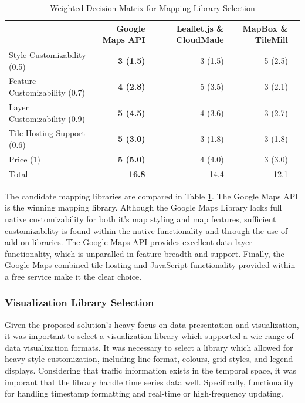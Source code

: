 \documentclass{report}
\begin{document}
\begin{table}
\centering
    \begin{tabular}{l |r r r l}
    ~                             & \textbf{Google Maps API} & Leaflet.js \& CloudMade & MapBox \& TileMill \\ \hline
    Style Customizability  (0.5)  & \textbf{3 (1.5)}         & 3 (1.5)                 & 5 (2.5)            \\
    Feature Customizability (0.7) & \textbf{4 (2.8)}         & 5 (3.5)                 & 3 (2.1)            \\
    Layer Customizability (0.9)   & \textbf{5 (4.5)}         & 4 (3.6)                 & 3 (2.7)            \\
    Tile Hosting Support (0.6)    & \textbf{5 (3.0)}           & 3 (1.8)                 & 3 (1.8)            \\
    Price (1)                     & \textbf{5 (5.0)}           & 4 (4.0)                   & 3 (3.0)              \\ \hline
    Total                         & \textbf{16.8}            & 14.4                    & 12.1               \\
    \end{tabular}
\caption{Weighted Decision Matrix for Mapping Library Selection}
\label{table:mapping-matrix}
\end{table}

The candidate mapping libraries are compared in Table \ref{table:mapping-matrix}. The Google Maps API is the winning mapping library. Although the Google Maps Library lacks full native customizability for both it's map styling and map features, sufficient customizability is found within the native functionality and through the use of add-on libraries. The Google Maps API provides excellent data layer functionality, which is unparalled in feature breadth and support. Finally, the Google Maps combined tile hosting and JavaScript functionality provided within a free service make it the clear choice.

\subsubsection{Visualization Library Selection}

Given the proposed solution's heavy focus on data presentation and visualization, it was important to select a visualization library which supported a wie range of data visualization formats. It was necessary to select a library which allowed for heavy style customization, including line format, colours, grid styles, and legend displays. Considering that traffic information exists in the temporal space, it was imporant that the library handle time series data well. Specifically, functionality for handling timestamp formatting and real-time or high-frequency updating.
\end{document}
